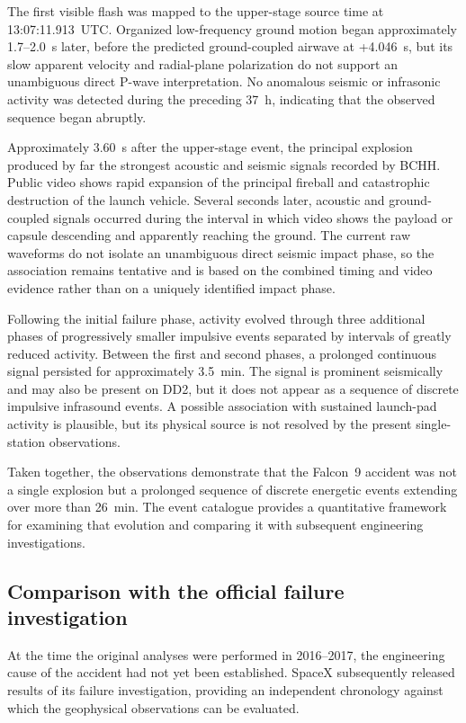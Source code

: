 \documentclass[]{seismica}
\begin{document}
The first visible flash was mapped to the upper-stage source time at
13:07:11.913~UTC. Organized low-frequency ground motion began approximately
1.7--2.0~s later, before the predicted ground-coupled airwave at +4.046~s, but
its slow apparent velocity and radial-plane polarization do not support an
unambiguous direct P-wave interpretation. No anomalous seismic or infrasonic
activity was detected during the preceding 37~h, indicating that the observed
sequence began abruptly.

Approximately 3.60~s after the upper-stage event, the principal explosion
produced by far the strongest acoustic and seismic signals recorded by BCHH.
Public video shows rapid expansion of the principal fireball and catastrophic
destruction of the launch vehicle. Several seconds later, acoustic and ground-coupled signals occurred during
the interval in which video shows the payload or capsule descending and
apparently reaching the ground. The current raw waveforms do not isolate an
unambiguous direct seismic impact phase, so the association remains tentative
and is based on the combined timing and video evidence rather than on a uniquely
identified impact phase.

Following the initial failure phase, activity evolved through three
additional phases of progressively smaller impulsive events separated by
intervals of greatly reduced activity. Between the first and second phases, a
prolonged continuous signal persisted for approximately 3.5~min. The signal is
prominent seismically and may also be present on DD2, but it does not appear as
a sequence of discrete impulsive infrasound events. A possible association with
sustained launch-pad activity is plausible, but its physical source is not
resolved by the present single-station observations.

Taken together, the observations demonstrate that the Falcon~9 accident was not a single explosion but a prolonged sequence of discrete energetic events extending over more than 26~min. The event catalogue provides a quantitative framework for examining that evolution and comparing it with subsequent engineering investigations.

\subsection{Comparison with the official failure investigation}
\label{sec:discussion_investigation}

At the time the original analyses were performed in 2016--2017, the engineering cause of the accident had not yet been established. SpaceX subsequently released results of its failure investigation, providing an independent chronology against which the geophysical observations can be evaluated.
\end{document}
